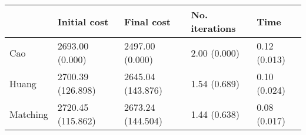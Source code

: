 \begin{tabular}{lllll}
\toprule
{} &       Initial cost &         Final cost & No. iterations &          Time \\
\midrule
Cao      &    2693.00 (0.000) &    2497.00 (0.000) &   2.00 (0.000) &  0.12 (0.013) \\
Huang    &  2700.39 (126.898) &  2645.04 (143.876) &   1.54 (0.689) &  0.10 (0.024) \\
Matching &  2720.45 (115.862) &  2673.24 (144.504) &   1.44 (0.638) &  0.08 (0.017) \\
\bottomrule
\end{tabular}

